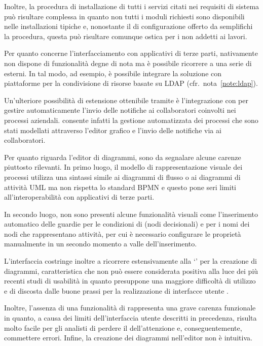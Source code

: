Inoltre, la procedura di installazione di tutti i servizi citati nei requisiti di sistema può risultare complessa in quanto non tutti i moduli richiesti sono disponibili nelle installazioni tipiche e, nonostante il  di configurazione offerto da \progname semplifichi la procedura, questa può risultare comunque ostica per i non addetti ai lavori.

Per quanto concerne l'interfacciamento con applicativi di terze parti, \progname nativamente non dispone di funzionalità degne di nota ma è possibile ricorrere a una serie di  esterni. In tal modo, ad esempio, è possibile integrare la soluzione con piattaforme per la condivisione di risorse basate su LDAP (cfr.~nota~\ref{note:ldap}).

Un'ulteriore possibilità di estensione ottenibile tramite  è l'integrazione con  per gestire automaticamente l'invio delle notifiche ai collaboratori coinvolti nei processi aziendali. \progname consente infatti la gestione automatizzata dei processi che sono stati modellati attraverso l'editor grafico e l'invio delle notifiche	via  ai collaboratori.

Per quanto riguarda l'editor di diagrammi, sono da segnalare alcune carenze piuttosto rilevanti. In primo luogo, il modello di rappresentazione visuale dei processi utilizza una sintassi simile ai diagrammi di flusso o ai diagrammi di attività UML ma non rispetta lo standard BPMN e questo pone seri limiti all'interoperabilità con applicativi di terze parti. 

In secondo luogo, non sono presenti alcune funzionalità visuali come l'inserimento automatico delle guardie per le condizioni di  (nodi decisionali) e per i nomi dei nodi che rappresentano attività, per cui è necessario configurare le proprietà manualmente in un secondo momento a valle dell'inserimento.

L'interfaccia  costringe inoltre a ricorrere estensivamente alla  `' per la creazione di diagrammi, caratteristica che non può essere considerata positiva alla luce dei più recenti studi di usabilità in quanto presuppone una maggiore difficoltà di utilizzo e di discosta dalle buone prassi per la realizzazione di interfacce utente \cite{nielsen:mistakes}.

Inoltre, l'assenza di una funzionalità di  rappresenta una grave carenza funzionale in quanto, a causa dei limiti dell'interfaccia utente descritti in precedenza, risulta molto facile per gli analisti di \bsn perdere il  dell'attenzione e, conseguentemente, commettere errori. Infine, la creazione dei diagrammi nell'editor non è intuitiva.

